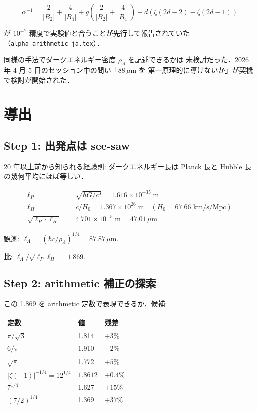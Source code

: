 \documentclass[11pt,a4paper]{article}
\begin{document}
\begin{equation}
\alpha^{-1} = \frac{2}{|B_2|} + \frac{4}{|B_4|} + g\left(\frac{2}{|B_2|}+\frac{4}{|B_4|}\right) + d(\zeta(2d{-}2)-\zeta(2d{-}1))
\end{equation}

が $10^{-7}$ 精度で実験値と合うことが先行して報告されていた
（\texttt{alpha\_arithmetic\_ja.tex}）．

同様の手法でダークエネルギー密度 $\rho_\Lambda$ を記述できるかは
未検討だった．2026 年 4 月 5 日のセッション中の問い「88\,$\mu$m を
第一原理的に導けないか」が契機で検討が開始された．

\section{導出}

\subsection{Step 1: 出発点は see-saw}

20 年以上前から知られる経験則: ダークエネルギー長は Planck 長と
Hubble 長の幾何平均にほぼ等しい．

\begin{align}
\ell_P &= \sqrt{\hbar G/c^3} = 1.616\times 10^{-35}\;\text{m}\\
\ell_H &= c/H_0 = 1.367\times 10^{26}\;\text{m}\quad(H_0 = 67.66\text{ km/s/Mpc})\\
\sqrt{\ell_P\cdot\ell_H} &= 4.701\times 10^{-5}\;\text{m} = 47.01\,\mu\text{m}
\end{align}

観測: $\ell_\Lambda = (\hbar c/\rho_\Lambda)^{1/4} = 87.87\,\mu$m.

\textbf{比}: $\ell_\Lambda / \sqrt{\ell_P\ell_H} = 1.869$.

\subsection{Step 2: arithmetic 補正の探索}

この 1.869 を arithmetic 定数で表現できるか．候補:

\begin{center}
\begin{tabular}{lll}
\toprule
定数 & 値 & 残差 \\
\midrule
$\pi/\sqrt{3}$ & 1.814 & $+3\%$ \\
$6/\pi$ & 1.910 & $-2\%$ \\
$\sqrt{\pi}$ & 1.772 & $+5\%$ \\
$|\zeta(-1)|^{-1/4} = 12^{1/4}$ & $\mathbf{1.8612}$ & $\mathbf{+0.4\%}$ \\
$7^{1/4}$ & 1.627 & $+15\%$ \\
$(7/2)^{1/4}$ & 1.369 & $+37\%$ \\
\bottomrule
\end{tabular}
\end{center}
\end{document}
